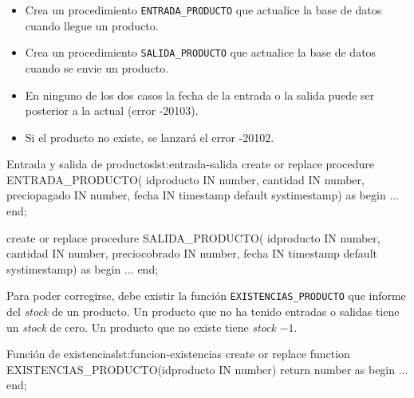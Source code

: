 \begin{homeworkProblem}

  \begin{itemize}
  \item Crea un procedimiento \texttt{ENTRADA\_PRODUCTO} que actualice la base de datos cuando llegue un producto.
  \item Crea un procedimiento \texttt{SALIDA\_PRODUCTO} que actualice la base de datos cuando se envie un producto.
  \item En ninguno de los dos casos la fecha de la entrada o la salida puede ser posterior a la actual (error -20103).
  \item Si el producto no existe, se lanzará el error -20102.
  \end{itemize}


  
  \begin{listadosql}{Entrada y salida de productos}{lst:entrada-salida}
create or replace procedure ENTRADA_PRODUCTO(
  idproducto IN number,
  cantidad IN number,
  preciopagado IN number,
  fecha IN timestamp default systimestamp)
as
begin
  ...
end; 

create or replace procedure SALIDA_PRODUCTO(
  idproducto IN number,
  cantidad IN number,
  preciocobrado IN number,
  fecha IN timestamp default systimestamp)
as
begin
  ...
end; 
  \end{listadosql}


  
  Para poder corregirse, debe existir la función \texttt{EXISTENCIAS\_PRODUCTO} que informe del \textit{stock} de un producto. Un producto que no ha tenido entradas o salidas tiene un \textit{stock} de cero. Un producto que no existe tiene \textit{stock} $-1$.

  \begin{listadosql}{Función de existencias}{lst:funcion-existencias}
create or replace function EXISTENCIAS_PRODUCTO(idproducto IN number) return number
as
begin
  ...
end; 
  \end{listadosql}  
  


\end{homeworkProblem}

